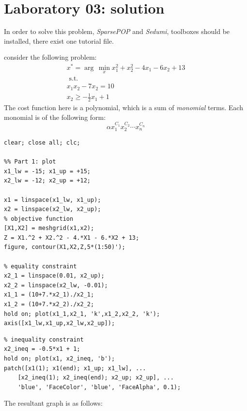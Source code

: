 \chapter{Laboratory 03: solution}
\begin{QandAbox}
In order to solve this problem, \textit{SparsePOP} and \textit{Sedumi}, toolboxes should be installed, there exist one tutorial file.
\end{QandAbox}
consider the following problem:
\[
\begin{array}{c}
x^* = \arg\,\min\limits_{x} x_1^2 + x_2^2 - 4x_1 - 6x_2 + 13\\
\text{ s.t. }\\[1em]
x_1x_2 - 7x_2 = 10\\ [1em]
x_2 \geq -\frac{1}{2}x_1 +1
\end{array}
\]
The cost function here is a polynomial, which is a sum of \textit{monomial} terms. Each monomial is of the following form:
\[
\alpha x_1^{C_1} x_2^{C_2} \cdots x_n^{C_n}
\]

\begin{example}
\begin{lstlisting}
clear; close all; clc;

%% Part 1: plot
x1_lw = -15; x1_up = +15;
x2_lw = -12; x2_up = +12;

x1 = linspace(x1_lw, x1_up);
x2 = linspace(x2_lw, x2_up);
% objective function
[X1,X2] = meshgrid(x1,x2);
Z = X1.^2 + X2.^2 - 4.*X1 - 6.*X2 + 13;
figure, contour(X1,X2,Z,5*(1:50)');

% equality constraint
x2_1 = linspace(0.01, x2_up);
x2_2 = linspace(x2_lw, -0.01);
x1_1 = (10+7.*x2_1)./x2_1;
x1_2 = (10+7.*x2_2)./x2_2;
hold on; plot(x1_1,x2_1, 'k',x1_2,x2_2, 'k');
axis([x1_lw,x1_up,x2_lw,x2_up]);
\end{lstlisting}
\end{example}


\begin{example}
\begin{lstlisting}
% inequality constraint
x2_ineq = -0.5*x1 + 1;
hold on; plot(x1, x2_ineq, 'b');
patch([x1(1); x1(end); x1_up; x1_lw], ...
    [x2_ineq(1); x2_ineq(end); x2_up; x2_up], ...
    'blue', 'FaceColor', 'blue', 'FaceAlpha', 0.1);
\end{lstlisting}
\end{example}
The resultant graph is as follows:

